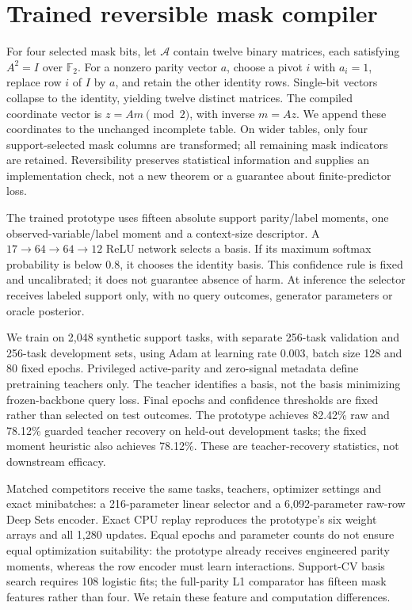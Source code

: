 \documentclass[10pt]{article}
\begin{document}
\section{Trained reversible mask compiler}
For four selected mask bits, let $\mathcal A$ contain twelve binary matrices, each satisfying $A^2=I$ over $\mathbb F_2$. For a nonzero parity vector $a$, choose a pivot $i$ with $a_i=1$, replace row $i$ of $I$ by $a$, and retain the other identity rows. Single-bit vectors collapse to the identity, yielding twelve distinct matrices. The compiled coordinate vector is $z=Am\pmod 2$, with inverse $m=Az$. We append these coordinates to the unchanged incomplete table. On wider tables, only four support-selected mask columns are transformed; all remaining mask indicators are retained. Reversibility preserves statistical information and supplies an implementation check, not a new theorem or a guarantee about finite-predictor loss.

The trained prototype uses fifteen absolute support parity/label moments, one observed-variable/label moment and a context-size descriptor. A $17\to64\to64\to12$ ReLU network selects a basis. If its maximum softmax probability is below 0.8, it chooses the identity basis. This confidence rule is fixed and uncalibrated; it does not guarantee absence of harm. At inference the selector receives labeled support only, with no query outcomes, generator parameters or oracle posterior.

We train on 2,048 synthetic support tasks, with separate 256-task validation and 256-task development sets, using Adam at learning rate 0.003, batch size 128 and 80 fixed epochs. Privileged active-parity and zero-signal metadata define pretraining teachers only. The teacher identifies a basis, not the basis minimizing frozen-backbone query loss. Final epochs and confidence thresholds are fixed rather than selected on test outcomes. The prototype achieves 82.42\% raw and 78.12\% guarded teacher recovery on held-out development tasks; the fixed moment heuristic also achieves 78.12\%. These are teacher-recovery statistics, not downstream efficacy.

Matched competitors receive the same tasks, teachers, optimizer settings and exact minibatches: a 216-parameter linear selector and a 6,092-parameter raw-row Deep Sets encoder. Exact CPU replay reproduces the prototype's six weight arrays and all 1,280 updates. Equal epochs and parameter counts do not ensure equal optimization suitability: the prototype already receives engineered parity moments, whereas the row encoder must learn interactions. Support-CV basis search requires 108 logistic fits; the full-parity L1 comparator has fifteen mask features rather than four. We retain these feature and computation differences.
\end{document}
